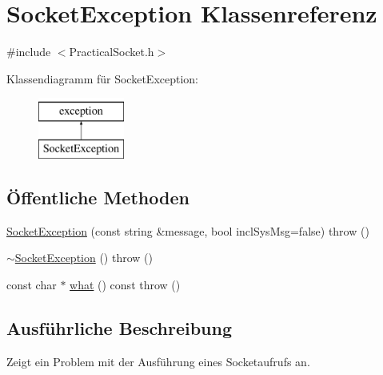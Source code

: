 \hypertarget{classSocketException}{\section{Socket\-Exception Klassenreferenz}
\label{classSocketException}
}


{\ttfamily \#include $<$Practical\-Socket.\-h$>$}

Klassendiagramm für Socket\-Exception\-:\begin{figure}[H]
\begin{center}
\leavevmode
\includegraphics[height=2.000000cm]{classSocketException}
\end{center}
\end{figure}
\subsection*{Öffentliche Methoden}
\begin{DoxyCompactItemize}
\item 
\hyperlink{classSocketException_abb5bcecd9d9e20868c237ec5a82cf5c3}{Socket\-Exception} (const string \&message, bool incl\-Sys\-Msg=false)  throw ()
\item 
\hyperlink{classSocketException_a659557c899329aea01977c980c4db9b9}{$\sim$\-Socket\-Exception} ()  throw ()
\item 
const char $\ast$ \hyperlink{classSocketException_a06b7b3f186976bb5ec7e7bf007c4f0ac}{what} () const   throw ()
\end{DoxyCompactItemize}


\subsection{Ausführliche Beschreibung}
Zeigt ein Problem mit der Ausführung eines Socketaufrufs an. 

